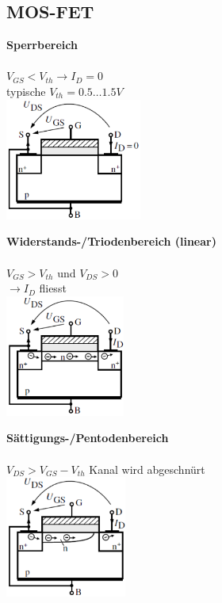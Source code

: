 	\subsection{MOS-FET}
            \begin{minipage}[T]{6cm}
                \textbf{Sperrbereich}\\\\
                $V_{GS} < V_{th} \to I_D = 0$\\
                typische $V_{th} = 0.5 \dots 1.5V$\\ 
                \includegraphics[height=4cm]{./images/MOSFETSperrbereich.png}
            \end{minipage}
            \begin{minipage}[T]{6cm}
                \textbf{Widerstands-/Triodenbereich (linear)}\\\\
                $V_{GS} > V_{th} $ und $V_{DS}>0$\\
                $\to I_D$ fliesst\\
                \includegraphics[height=4cm]{./images/MOSFETLinBereich.png}
            \end{minipage}
            \begin{minipage}[T]{6cm}
                \textbf{Sättigungs-/Pentodenbereich}\\\\
                $V_{DS} > V_{GS} - V_{th}$ Kanal wird abgeschnürt\\
                \includegraphics[height=4cm]{./images/MOSFETSaettBereich.png}
            \end{minipage}\\
            
